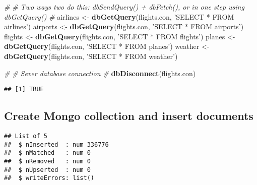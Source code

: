 \documentclass[]{article}
\newenvironment{Shaded}{\begin{snugshade}}{\end{snugshade}}
\newcommand{\KeywordTok}[1]{\textcolor[rgb]{0.13,0.29,0.53}{\textbf{#1}}}
\newcommand{\DataTypeTok}[1]{\textcolor[rgb]{0.13,0.29,0.53}{#1}}
\newcommand{\StringTok}[1]{\textcolor[rgb]{0.31,0.60,0.02}{#1}}
\newcommand{\CommentTok}[1]{\textcolor[rgb]{0.56,0.35,0.01}{\textit{#1}}}
\newcommand{\OperatorTok}[1]{\textcolor[rgb]{0.81,0.36,0.00}{\textbf{#1}}}
\newcommand{\NormalTok}[1]{#1}
\begin{document}
\begin{Shaded}
\begin{Highlighting}[]
\CommentTok{#}
\CommentTok{# Two ways two do this: dbSendQuery() + dbFetch(), or in one step using dbGetQuery()}
\CommentTok{#}
\NormalTok{airlines <-}\StringTok{ }\KeywordTok{dbGetQuery}\NormalTok{(flights.con,}
                       \StringTok{'SELECT * FROM airlines'}\NormalTok{)}
\NormalTok{airports <-}\StringTok{ }\KeywordTok{dbGetQuery}\NormalTok{(flights.con,}
                       \StringTok{'SELECT * FROM airports'}\NormalTok{)}
\NormalTok{flights <-}\StringTok{ }\KeywordTok{dbGetQuery}\NormalTok{(flights.con,}
                      \StringTok{'SELECT * FROM flights'}\NormalTok{)}
\NormalTok{planes <-}\StringTok{ }\KeywordTok{dbGetQuery}\NormalTok{(flights.con,}
                     \StringTok{'SELECT * FROM planes'}\NormalTok{)}
\NormalTok{weather <-}\StringTok{ }\KeywordTok{dbGetQuery}\NormalTok{(flights.con,}
                      \StringTok{'SELECT * FROM weather'}\NormalTok{)}

\CommentTok{#}
\CommentTok{# Sever database connection}
\CommentTok{#}
\KeywordTok{dbDisconnect}\NormalTok{(flights.con)}
\end{Highlighting}
\end{Shaded}

\begin{verbatim}
## [1] TRUE
\end{verbatim}

\subsection{Create Mongo collection and insert
documents}\label{create-mongo-collection-and-insert-documents}

\begin{Shaded}
\end{Shaded}

\begin{verbatim}
## List of 5
##  $ nInserted  : num 336776
##  $ nMatched   : num 0
##  $ nRemoved   : num 0
##  $ nUpserted  : num 0
##  $ writeErrors: list()
\end{verbatim}
\end{document}
